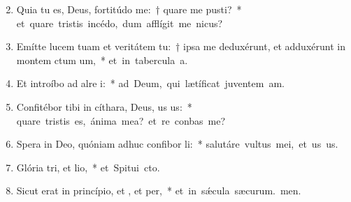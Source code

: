 \begin{flushleft}
\begin{enumerate}[leftmargin=*]
\setcounter{enumi}{1}

\item Quia tu es, Deus, fortitúdo me:~† quare me pusti?~* \mbox{et quare tristis incédo, dum afflígit me nicus?}
\item Emítte lucem tuam et veritátem tu:~† ipsa me deduxérunt, et adduxérunt in montem ctum um,~* \mbox{et in tabercula a.}
\item Et introíbo ad alre i:~* \mbox{ad Deum, qui lætíficat juventem am.}
\item Confitébor tibi in cíthara, Deus, us us:~* \mbox{quare tristis es, ánima mea? et re conbas me?}
\item Spera in Deo, quóniam adhuc confibor li:~* \mbox{salutáre vultus mei, et us us.}
\item Glória tri, et lio,~* \mbox{et Spitui cto.}
\item Sicut erat in princípio, et , et per,~* \mbox{et in s\'{\ae}cula sæcurum. men.}

\end{enumerate}
\end{flushleft}

